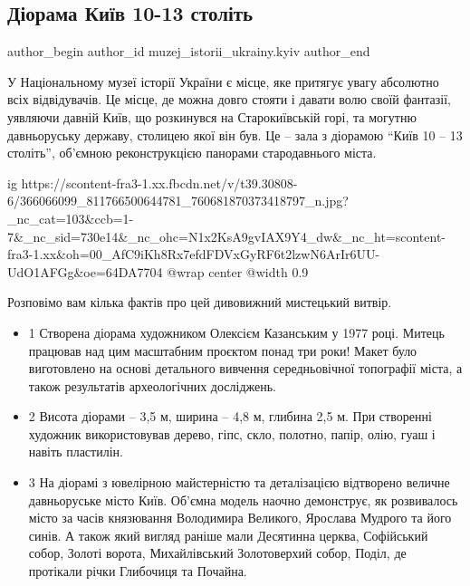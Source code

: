  
 
 
 
 

\subsection{Діорама Київ 10-13 століть}
\label{sec:11_08_2023.fb.muzej_istorii_ukrainy.kyiv.1.diorama_kyiv_10_13_st}

\ifcmt
 author_begin
   author_id muzej_istorii_ukrainy.kyiv
 author_end
\fi

У Національному музеї історії України є місце, яке притягує увагу абсолютно
всіх відвідувачів. Це місце, де можна довго стояти і давати волю своїй
фантазії, уявляючи давній Київ, що розкинувся на Старокиївській горі, та
могутню давньоруську державу, столицею якої він був. Це – зала з діорамою \enquote{Київ
10 – 13 століть}, об'ємною реконструкцією панорами стародавнього міста. 

\ifcmt
  ig https://scontent-fra3-1.xx.fbcdn.net/v/t39.30808-6/366066099_811766500644781_760681870373418797_n.jpg?_nc_cat=103&ccb=1-7&_nc_sid=730e14&_nc_ohc=N1x2KsA9gvIAX9Y4_dw&_nc_ht=scontent-fra3-1.xx&oh=00_AfC9iKh8Rx7efdFDVxGyRF6t2lzwN6ArIr6UU-UdO1AFGg&oe=64DA7704
  @wrap center
  @width 0.9
\fi

Розповімо вам кілька фактів про цей дивовижний мистецький витвір.

\begin{itemize}
\item 1 Створена діорама художником Олексієм Казанським у 1977 році. Митець працював
над цим масштабним проєктом понад три роки! Макет було виготовлено на основі
детального вивчення середньовічної топографії міста, а також результатів
археологічних досліджень. 

\item 2 Висота діорами – 3,5 м, ширина – 4,8 м, глибина 2,5 м. При створенні художник
використовував  дерево, гіпс, скло, полотно, папір, олію, гуаш і навіть
пластилін. 

\item 3 На діорамі з ювелірною майстерністю та деталізацією відтворено величне
давньоруське місто Київ. Об'ємна модель наочно демонструє, як розвивалось місто
за часів князювання Володимира Великого, Ярослава Мудрого та його синів. А
також який вигляд раніше мали Десятинна церква, Софійський собор, Золоті
ворота, Михайлівський Золотоверхий собор, Поділ, де протікали річки Глибочиця
та Почайна.
\end{itemize}

